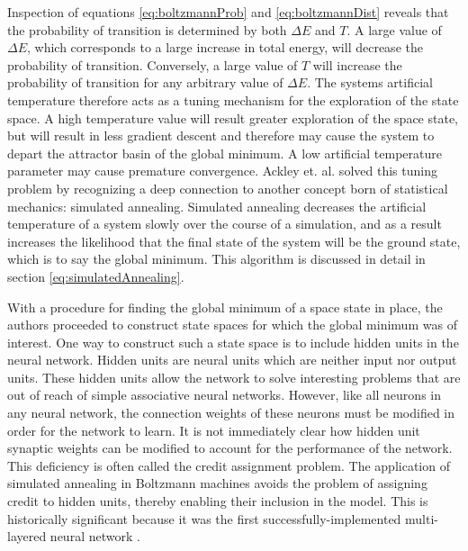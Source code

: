 \documentclass[11pt]{afthesis}
\begin{document}
	Inspection of equations \ref{eq:boltzmannProb} and \ref{eq:boltzmannDist} reveals that the probability of transition is determined by both \begin{math}\Delta E\end{math} and \begin{math}T\end{math}. A large value of \begin{math}\Delta E\end{math}, which corresponds to a large increase in total energy, will decrease the probability of transition. Conversely, a large value of \begin{math}T\end{math} will increase the probability of transition for any arbitrary value of \begin{math}\Delta E\end{math}. The systems artificial temperature therefore acts as a tuning mechanism for the exploration of the state space. A high temperature value will result greater exploration of the space state, but will result in less gradient descent and therefore may cause the system to depart the attractor basin of the global minimum. A low artificial temperature parameter may cause premature convergence. Ackley et. al. solved this tuning problem by recognizing a deep connection to another concept born of statistical mechanics: simulated annealing. Simulated annealing decreases the artificial temperature of a system slowly over the course of a simulation, and as a result increases the likelihood that the final state of the system will be the ground state, which is to say the global minimum. This algorithm is discussed in detail in section \ref{eq:simulatedAnnealing}.
	
	With a procedure for finding the global minimum of a space state in place, the authors proceeded to construct state spaces for which the global minimum was of interest. One way to construct such a state space is to include hidden units in the neural network. Hidden units are neural units which are neither input nor output units. These hidden units allow the network to solve interesting problems that are out of reach of simple associative neural networks\cite{anderson1988neurocomputing}. However, like all neurons in any neural network, the connection weights of these neurons must be modified in order for the network to learn. It is not immediately clear how hidden unit synaptic weights can be modified to account for the performance of the network. This deficiency is often called the credit assignment problem\cite{barto1983neuronlike}. The application of simulated annealing in Boltzmann machines avoids the problem of assigning credit to hidden units, thereby enabling their inclusion in the model. This is historically significant because it was the first successfully-implemented multi-layered neural network \cite{haykin1999}.
\end{document}
